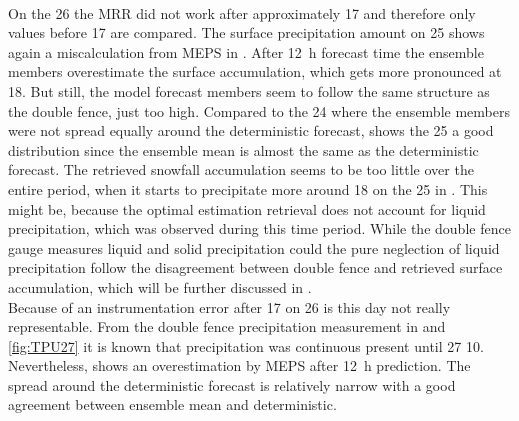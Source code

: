 \\
On the \SI{26}{\dec} the MRR did not work after approximately \SI{17}{\UTC} and therefore only values before \SI{17}{\UTC} are compared. 
The surface precipitation amount on \SI{25}{\dec} shows again a miscalculation from MEPS in . After \SI{12}{\hour} forecast time the ensemble members overestimate the surface accumulation, which gets more pronounced at \SI{18}{\UTC}. But still, the model forecast members seem to follow the same structure as the double fence, just too high. Compared to the \SI{24}{\dec} where the ensemble members were not spread equally around the deterministic forecast, shows the \SI{25}{\dec} a good distribution since the ensemble mean is almost the same as the deterministic forecast. 
The retrieved snowfall accumulation seems to be too little over the entire period, when it starts to precipitate more around \SI{18}{\UTC} on the \SI{25}{\dec} in . This might be, because the optimal estimation retrieval does not account for liquid precipitation, which was observed during this time period. While the double fence gauge measures liquid and solid precipitation could the pure neglection of liquid precipitation follow the disagreement between double fence and retrieved surface accumulation, which will be further discussed in .
\\
Because of an instrumentation error after \SI{17}{\UTC} on \SI{26}{\dec} is this day not really representable. From the double fence precipitation measurement in  and \ref{fig:TPU27} it is known that precipitation was continuous present until \SI{27}{\dec} \SI{10}{\UTC}. Nevertheless,  shows an overestimation by MEPS after \SI{12}{\hour} prediction. The spread around the deterministic forecast is relatively narrow with a good agreement between ensemble mean and deterministic. 
\\ \noindent
%
